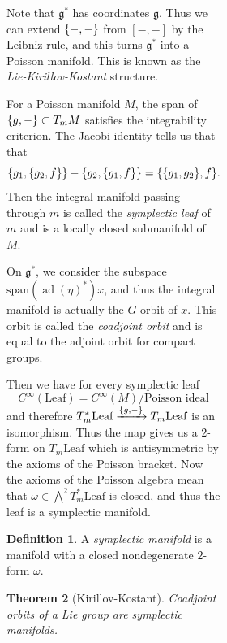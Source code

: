 \documentclass[leqno, openany]{memoir}
\newtheorem{thm}{Theorem}[section]
\theoremstyle{definition}
\newtheorem{defn}[thm]{Definition}
\theoremstyle{remark}
\theoremstyle{plain}
\theoremstyle{definition}
\theoremstyle{remark}
\newcommand{\mf}[1]{\mathfrak{#1}}
\newcommand{\mr}[1]{\mathrm{#1}}
\DeclareMathOperator{\ad}{ad}
\begin{document}
\begin{figure}[H]
\begin{figure}[H]
\begin{figure}[H]
Note that $\mf{g}^*$ has coordinates $\mf{g}$. Thus we can extend $\qty{-,-}$
from $[-,-]$ by the Leibniz rule, and this turns $\mf{g}^*$ into a Poisson
manifold. This is known as the \textit{Lie-Kirillov-Kostant} structure.

For a Poisson manifold $M$, the span of $\qty{g,-} \subset T_m M$ satisfies the
integrability criterion. The Jacobi identity tells us that that \[ \qty{g_1,
\qty{g_2, f}} - \qty{g_2, \qty{g_1, f}} = \qty{\qty{g_1, g_2}, f}. \] Then the
integral manifold passing through $m$ is called the \textit{symplectic leaf} of
$m$ and is a locally closed submanifold of $M$.

On $\mf{g}^*$, we consider the subspace $\mr{span}(\ad(\eta)^*) x$, and thus
the integral manifold is actually the $G$-orbit of $x$. This orbit is called
the \textit{coadjoint orbit} and is equal to the adjoint orbit for compact
groups. 

Then we have for every symplectic leaf \[ C^{\infty}(\text{Leaf}) =
C^{\infty}(M) / \text{Poisson ideal} \] and therefore $T_m^* \text{Leaf}
\xrightarrow{\qty{g,-}} T_m \text{Leaf}$ is an isomorphism. Thus the map gives
us a $2$-form on $T_m \text{Leaf}$ which is antisymmetric by the axioms of the
Poisson bracket. Now the axioms of the Poisson algebra mean that $\omega \in
\bigwedge^2 T_m^* \text{Leaf}$ is closed, and thus the leaf is a symplectic
manifold.

\begin{defn} A \textit{symplectic manifold} is a manifold with a closed
nondegenerate $2$-form $\omega$.  \end{defn}

\begin{thm}[Kirillov-Kostant] Coadjoint orbits of a Lie group are symplectic
manifolds.  \end{thm}


\end{figure}
\end{figure}
\end{figure}
\end{document}
